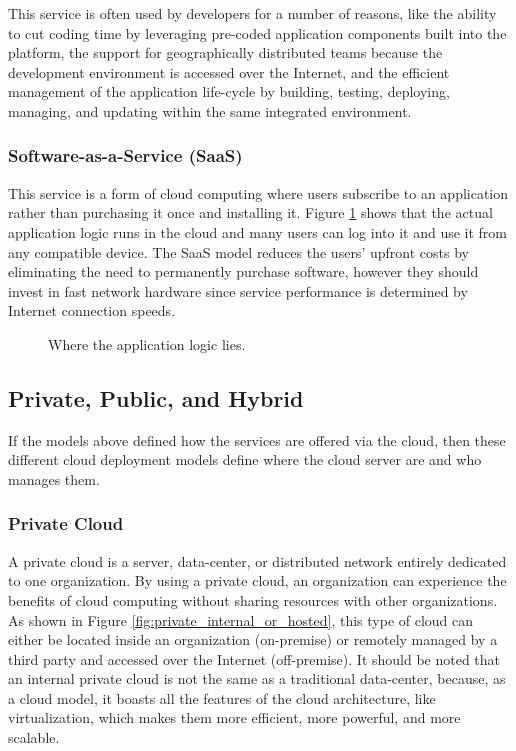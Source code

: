 This service is often used by developers for a number of reasons, like the ability to cut coding time by leveraging pre-coded application components built into the platform, the support for geographically distributed teams because the development environment is accessed over the Internet, and the efficient management of the application life-cycle by building, testing, deploying, managing, and updating within the same integrated environment.


\subsubsection{Software-as-a-Service (SaaS)}

This service is a form of cloud computing where users subscribe to an application rather than purchasing it once and installing it. Figure \ref{fig:saas} shows that the actual application logic runs in the cloud and many users can log into it and use it from any compatible device. The SaaS model reduces the users' upfront costs by eliminating the need to permanently purchase software, however they should invest in fast network hardware since service performance is determined by Internet connection speeds.

\begin{figure}[!htb]
    \centering
    
    
    \caption{Where the application logic lies. \cite{saas}}
    \label{fig:saas}
\end{figure}

\subsection{Private, Public, and Hybrid}
If the models above defined how the services are offered via the cloud, then these different cloud deployment models define where the cloud server are and who manages them.

\subsubsection{Private Cloud}
A private cloud is a server, data-center, or distributed network entirely dedicated to one organization. By using a private cloud, an organization can experience the benefits of cloud computing without sharing resources with other organizations. As shown in Figure \ref{fig:private_internal_or_hosted}, this type of cloud can either be located inside an organization (on-premise) or remotely managed by a third party and accessed over the Internet (off-premise). It should be noted that an internal private cloud is not the same as a traditional data-center, because, as a cloud model, it boasts all the features of the cloud architecture, like virtualization, which makes them more efficient, more powerful, and more scalable.


